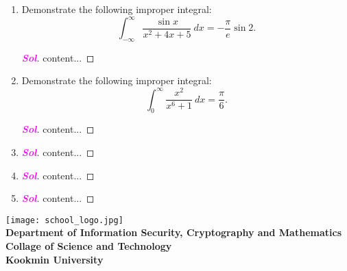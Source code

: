 \documentclass{article}
\newcommand{\footer}[1]{
	\begin{flushright}
		\vspace{2em}
		\texttt{[image: school\_logo.jpg]} \\
		\vspace{1em}
		\textcolor{blue2}{\small\textbf{#1}}
	\end{flushright}
}
\theoremstyle{definition}
\newcommand{\sol}{\textcolor{magenta}{\bf Sol}}
\begin{document}
\begin{enumerate}[\bf 1.]
\begin{enumerate}
\begin{center}
\begin{tikzpicture}[scale=1]
				\end{tikzpicture}
			\end{center}
			demonstrate the following improper integral:\[
			\int_{0}^{\infty}\frac{1}{x^3+1}\ dx=\frac{2\pi}{3\sqrt{3}}.
			\]
		\end{enumerate}\begin{proof}[\sol]
			df
		\end{proof}
		\item Demonstrate the following improper integral: \[
		\int_{-\infty}^\infty\frac{\sin x}{x^2+4x+5}\ dx=-\frac{\pi}{e}\sin 2.
		\] \begin{proof}[\sol]
			content...
		\end{proof}
		\item Demonstrate the following improper integral: \[
		\int_0^{\infty}\frac{x^2}{x^6+1}\ dx=\frac{\pi}{6}.
		\] \begin{proof}[\sol]
			content...
		\end{proof}
		\item \begin{proof}[\sol]
			content...
		\end{proof}
		\item \begin{proof}[\sol]
			content...
		\end{proof}
		\item \begin{proof}[\sol]
			content...
		\end{proof}
	\end{enumerate}
	
	\footer{Department of Information Security, Cryptography and Mathematics\\
		Collage of Science and Technology\\
		Kookmin University}
\end{document}
